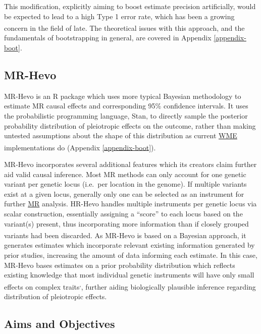 \documentclass[
]{article}
\begin{document}
This modification, explicitly aiming to boost estimate precision artificially, would be expected to lead to a high Type 1 error rate, which has been a growing concern in the field of late\textsuperscript{}. The theoretical issues with this approach, and the fundamentals of bootstrapping in general, are covered in Appendix \ref{appendix-boot}.

\subsection{MR-Hevo}\label{mr-hevo}

MR-Hevo is an R package which uses more typical Bayesian methodology to estimate MR causal effects and corresponding 95\% confidence intervals. It uses the probabilistic programming language, Stan, to directly sample the posterior probability distribution of pleiotropic effects on the outcome, rather than making untested assumptions about the shape of this distribution as current \hyperref[acronyms_WME]{WME} implementations do\textsuperscript{} (Appendix \ref{appendix-boot}).

MR-Hevo incorporates several additional features which its creators claim further aid valid causal inference. Most MR methods can only account for one genetic variant per genetic locus (i.e.~per location in the genome). If multiple variants exist at a given locus, generally only one can be selected as an instrument for further \hyperref[acronyms_MR]{MR} analysis. HR-Hevo handles multiple instruments per genetic locus via scalar construction, essentially assigning a ``score'' to each locus based on the variant(s) present, thus incorporating more information than if closely grouped variants had been discarded\textsuperscript{}. As MR-Hevo is based on a Bayesian approach, it generates estimates which incorporate relevant existing information generated by prior studies, increasing the amount of data informing each estimate. In this case, MR-Hevo bases estimates on a prior probability distribution which reflects existing knowledge that most individual genetic instruments will have only small effects on complex traits\textsuperscript{,}, further aiding biologically plausible inference regarding distribution of pleiotropic effects.

\subsection{Aims and Objectives}\label{aims-and-objectives}
\end{document}
